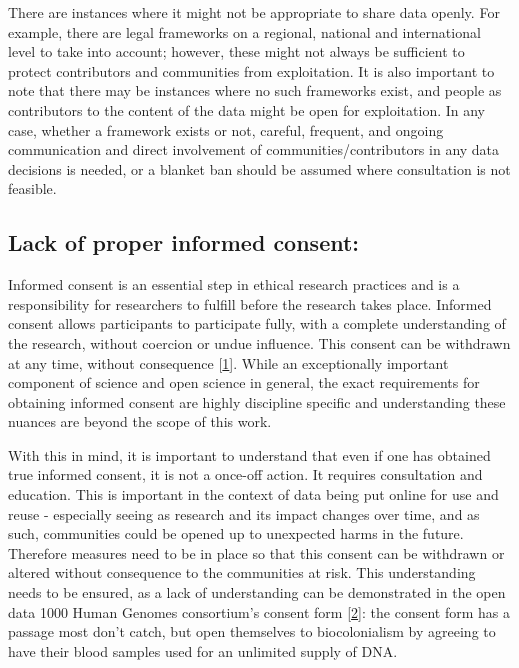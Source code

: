 \documentclass[
  letterpaper,
  DIV=11,
  numbers=noendperiod]{scrreport}
\begin{document}
There are instances where it might not be appropriate to share data
openly. For example, there are legal frameworks on a regional, national
and international level to take into account; however, these might not
always be sufficient to protect contributors and communities from
exploitation. It is also important to note that there may be instances
where no such frameworks exist, and people as contributors to the
content of the data might be open for exploitation. In any case, whether
a framework exists or not, careful, frequent, and ongoing communication
and direct involvement of communities/contributors in any data decisions
is needed, or a blanket ban should be assumed where consultation is not
feasible.

\hypertarget{lack-of-proper-informed-consent}{%
\subsection{Lack of proper informed
consent:}\label{lack-of-proper-informed-consent}}

Informed consent is an essential step in ethical research practices and
is a responsibility for researchers to fulfill before the research takes
place. Informed consent allows participants to participate fully, with a
complete understanding of the research, without coercion or undue
influence. This consent can be withdrawn at any time, without
consequence
{[}\href{https://researchsupport.admin.ox.ac.uk/governance/ethics/resources/consent\#:~:text=Informed\%20consent\%20is\%20one\%20of,before\%20they\%20enter\%20the\%20research.}{1}{]}.
While an exceptionally important component of science and open science
in general, the exact requirements for obtaining informed consent are
highly discipline specific and understanding these nuances are beyond
the scope of this work.

With this in mind, it is important to understand that even if one has
obtained true informed consent, it is not a once-off action. It requires
consultation and education. This is important in the context of data
being put online for use and reuse - especially seeing as research and
its impact changes over time, and as such, communities could be opened
up to unexpected harms in the future. Therefore measures need to be in
place so that this consent can be withdrawn or altered without
consequence to the communities at risk. This understanding needs to be
ensured, as a lack of understanding can be demonstrated in the open data
1000 Human Genomes consortium's consent form
{[}\href{https://www.internationalgenome.org/sites/1000genomes.org/files/docs/Informed\%20Consent\%20Form\%20Template.pdf}{2}{]}:
the consent form has a passage most don't catch, but open themselves to
biocolonialism by agreeing to have their blood samples used for an
unlimited supply of DNA.
\end{document}
